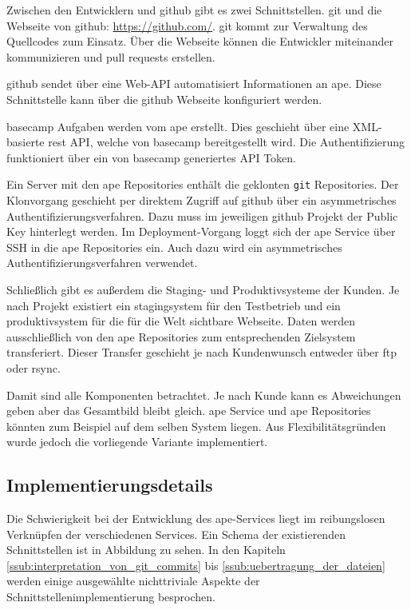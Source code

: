 Zwischen den Entwicklern und \gls{github} gibt es zwei Schnittstellen. \gls{git} und die Webseite von \gls{github}: \url{https://github.com/}. \gls{git} kommt zur Verwaltung des Quellcodes zum Einsatz. Über die Webseite können die Entwickler miteinander kommunizieren und \glspl{pull request} erstellen.

\gls{github} sendet über eine Web-API automatisiert Informationen an \gls{ape}. Diese Schnittstelle kann über die \gls{github} Webseite konfiguriert werden.

\gls{basecamp} Aufgaben werden vom \gls{ape} erstellt. Dies geschieht über eine XML-basierte \gls{rest} API, welche von \gls{basecamp} bereitgestellt wird. Die Authentifizierung funktioniert über ein von \gls{basecamp} generiertes API Token.

Ein Server mit den \gls{ape} Repositories enthält die geklonten \lstinline!git! Repositories. Der Klonvorgang geschieht per direktem Zugriff auf \gls{github} über ein asymmetrisches Authentifizierungsverfahren. Dazu muss im jeweiligen \gls{github} Projekt der Public Key hinterlegt werden. Im Deployment-Vorgang loggt sich der \gls{ape} Service über SSH in die \gls{ape} Repositories ein. Auch dazu wird ein asymmetrisches Authentifizierungsverfahren verwendet.

Schließlich gibt es außerdem die Staging- und Produktivsysteme der Kunden. Je nach Projekt existiert ein \gls{stagingsystem} für den Testbetrieb und ein \gls{produktivsystem} für die für die Welt sichtbare Webseite. Daten werden ausschließlich von den \gls{ape} Repositories zum entsprechenden Zielsystem transferiert. Dieser Transfer geschieht je nach Kundenwunsch entweder über \gls{ftp} oder \gls{rsync}.

Damit sind alle Komponenten betrachtet. Je nach Kunde kann es Abweichungen geben aber das Gesamtbild bleibt gleich. \gls{ape} Service und \gls{ape} Repositories könnten zum Beispiel auf dem selben System liegen. Aus Flexibilitätsgründen wurde jedoch die vorliegende Variante implementiert.



\subsection{Implementierungsdetails} %
\label{sub:implementierungsdetails}

Die Schwierigkeit bei der Entwicklung des \gls{ape}-Services liegt im reibungslosen Verknüpfen der verschiedenen Services. Ein Schema der existierenden Schnittstellen ist in Abbildung zu sehen. In den Kapiteln \ref{ssub:interpretation_von_git_commits} bis \ref{ssub:uebertragung_der_dateien} werden einige ausgewählte nichttriviale Aspekte der Schnittstellenimplementierung besprochen.


